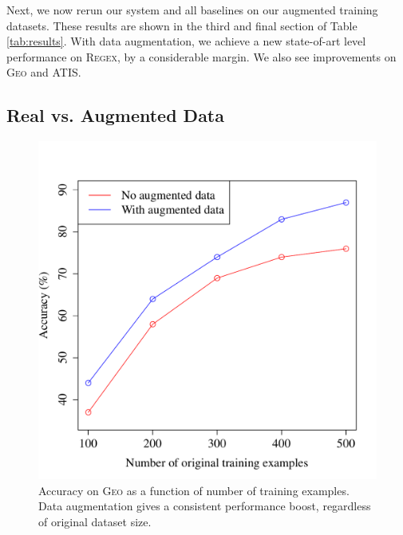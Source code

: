 \documentclass[11pt,letterpaper]{article}
\newcommand{\atis}{\textsc{ATIS}\xspace}
\newcommand{\regex}{\textsc{Regex}\xspace}
\newcommand{\geo}{\textsc{Geo}\xspace}
\begin{document}
Next, we now rerun our system and all baselines on our
augmented training datasets.  These results are shown in the
third and final section of Table \ref{tab:results}.
With data augmentation, we achieve a new state-of-art level performance
on \regex, by a considerable margin.  We also see
improvements on \geo and \atis.


\subsection{Real vs. Augmented Data}
\begin{figure}[t] 
\small
\begin{center} 
  \includegraphics[scale=0.4]{fig-geo-augment.pdf}
\end{center} 
\caption{Accuracy on \geo as a function of number of training examples.
  Data augmentation gives a consistent performance boost,
regardless of original dataset size.}
\label{fig:geo-augment}
\end{figure}
\end{document}
